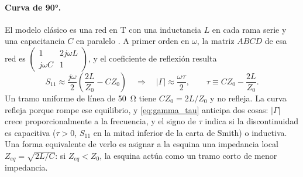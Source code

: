 \documentclass[11pt,letterpaper]{article}
\begin{document}
\paragraph{Curva de \ang{90}.} El modelo clásico es una red en T con una inductancia $L$ en cada rama serie y una capacitancia $C$ en paralelo \cite{gupta}. A primer orden en $\omega$, la matriz $ABCD$ de esa red es $\begin{pmatrix}1 & 2j\omega L\\ j\omega C & 1\end{pmatrix}$, y el coeficiente de reflexión resulta
\begin{equation}
S_{11} \approx \frac{j\omega}{2}\left(\frac{2L}{Z_0} - C Z_0\right)
\quad\Longrightarrow\quad
|\Gamma| \approx \frac{\omega\tau}{2}, \qquad \tau \equiv C Z_0 - \frac{2L}{Z_0}.
\label{eq:gamma_tau}
\end{equation}
Un tramo uniforme de línea de \SI{50}{\ohm} tiene $C Z_0 = 2L/Z_0$ y no refleja. La curva refleja porque rompe ese equilibrio, y \eqref{eq:gamma_tau} anticipa dos cosas: $|\Gamma|$ crece proporcionalmente a la frecuencia, y el signo de $\tau$ indica si la discontinuidad es capacitiva ($\tau>0$, $S_{11}$ en la mitad inferior de la carta de Smith) o inductiva. Una forma equivalente de verlo es asignar a la esquina una impedancia local $Z_{eq}=\sqrt{2L/C}$: si $Z_{eq}<Z_0$, la esquina actúa como un tramo corto de menor impedancia.
\end{document}
